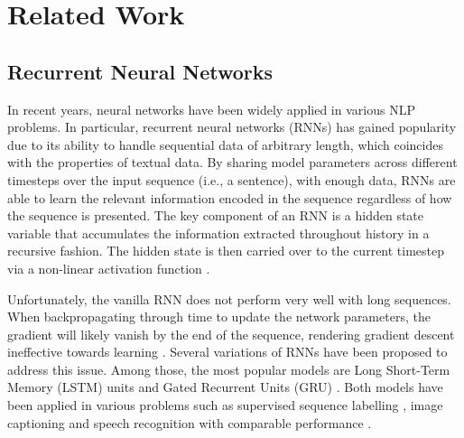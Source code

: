\section{Related Work}
\label{sec: related_work}
\subsection{Recurrent Neural Networks}
In recent years, neural networks have been widely applied in various NLP problems. In particular, recurrent neural networks (RNNs) has gained popularity due to its ability to handle sequential data of arbitrary length, which coincides with the properties of textual data. By sharing model parameters across different timesteps over the input sequence (i.e., a sentence), with enough data, RNNs are able to learn the relevant information encoded in the sequence regardless of how the sequence is presented. The key component of an RNN is a hidden state variable that accumulates the information extracted throughout history in a recursive fashion. The hidden state is then carried over to the current timestep via a non-linear activation function \cite{goodfellow2016}.

Unfortunately, the vanilla RNN does not perform very well with long sequences. When backpropagating through time to update the network parameters, the gradient will likely vanish by the end of the sequence, rendering gradient descent ineffective towards learning \cite{goodfellow2016}. Several variations of RNNs have been proposed to address this issue. Among those, the most popular models are Long Short-Term Memory (LSTM) units \cite{hochreiter1997long} and Gated Recurrent Units (GRU) \cite{cho2014properties}. Both models have been applied in various problems such as supervised sequence labelling \cite{graves2012supervised}, image captioning \cite{vinyals_2015} and speech recognition \cite{graves2013speech} with comparable performance \cite{yin2017comparative}.

